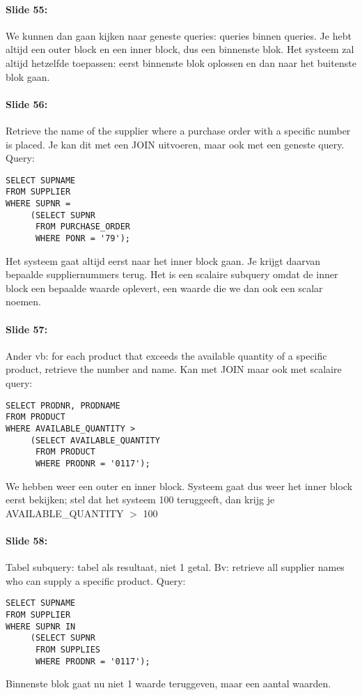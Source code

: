 \documentclass[10pt,a4paper]{report}
\begin{document}
\paragraph{Slide 55:}We kunnen dan gaan kijken naar geneste queries: queries binnen queries. Je hebt altijd een outer block en een inner block, dus een binnenste blok. Het systeem zal altijd hetzelfde toepassen: eerst binnenste blok oplossen en dan naar het buitenste blok gaan.

\paragraph{Slide 56:}Retrieve the name of the supplier where a purchase order with a specific number is placed. Je kan dit met een JOIN uitvoeren, maar ook met een geneste query. Query:
\begin{verbatim}
SELECT SUPNAME
FROM SUPPLIER
WHERE SUPNR = 
     (SELECT SUPNR
      FROM PURCHASE_ORDER
      WHERE PONR = '79');
\end{verbatim}
Het systeem gaat altijd eerst naar het inner block gaan. Je krijgt daarvan bepaalde suppliernummers terug. Het is een scalaire subquery omdat de inner block een bepaalde waarde oplevert, een waarde die we dan ook een scalar noemen.

\paragraph{Slide 57:}Ander vb: for each product that exceeds the available quantity of a specific product, retrieve the number and name. Kan met JOIN maar ook met scalaire query:
\begin{verbatim}
SELECT PRODNR, PRODNAME
FROM PRODUCT
WHERE AVAILABLE_QUANTITY >
     (SELECT AVAILABLE_QUANTITY
      FROM PRODUCT
      WHERE PRODNR = '0117');
\end{verbatim}
We hebben weer een outer en inner block. Systeem gaat dus weer het inner block eerst bekijken; stel dat het systeem 100 teruggeeft, dan krijg je AVAILABLE\_QUANTITY $>$ 100

\paragraph{Slide 58:}Tabel subquery: tabel als resultaat, niet 1 getal. Bv: retrieve all supplier names who can supply a specific product. Query:
\begin{verbatim}
SELECT SUPNAME
FROM SUPPLIER
WHERE SUPNR IN
     (SELECT SUPNR
      FROM SUPPLIES
      WHERE PRODNR = '0117');
\end{verbatim}
Binnenste blok gaat nu niet 1 waarde teruggeven, maar een aantal waarden.
\end{document}
